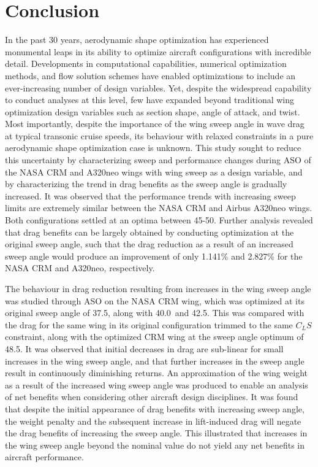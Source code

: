 \chapter{Conclusion}
In the past 30 years, aerodynamic shape optimization has experienced monumental leaps in its ability to optimize aircraft configurations with incredible detail.
Developments in computational capabilities, numerical optimization methods, and flow solution schemes have enabled optimizations to include an ever-increasing number of design variables.
Yet, despite the widespread capability to conduct analyses at this level, few have expanded beyond traditional wing optimization design variables such as section shape, angle of attack, and twist.
Most importantly, despite the importance of the wing sweep angle in wave drag at typical transonic cruise speeds, its behaviour with relaxed constraints in a pure aerodynamic shape optimization case is unknown.
This study sought to reduce this uncertainty by characterizing sweep and performance changes during ASO of the NASA CRM and A320neo wings with wing sweep as a design variable, and by characterizing the trend in drag benefits as the sweep angle is gradually increased.
It was observed that the performance trends with increasing sweep limits are extremely similar between the NASA CRM and Airbus A320neo wings. Both configurations settled at an optima between 45-50\degree. Further analysis revealed that drag benefits can be largely obtained by conducting optimization at the original sweep angle, such that the drag reduction as a result of an increased sweep angle would produce an improvement of only 1.141\% and 2.827\% for the NASA CRM and A320neo, respectively.

The behaviour in drag reduction resulting from increases in the wing sweep angle was studied through ASO on the NASA CRM wing, which was optimized at its original sweep angle of 37.5\degree, along with 40.0\degree\ and 42.5\degree. This was compared with the drag for the same wing in its original configuration trimmed to the same $C_L S$ constraint, along with the optimized CRM wing at the sweep angle optimum of 48.5\degree. It was observed that initial decreases in drag are sub-linear for small increases in the wing sweep angle, and that further increases in the sweep angle result in continuously diminishing returns. An approximation of the wing weight as a result of the increased wing sweep angle was produced to enable an analysis of net benefits when considering other aircraft design disciplines. It was found that despite the initial appearance of drag benefits with increasing sweep angle, the weight penalty and the subsequent increase in lift-induced drag will negate the drag benefits of increasing the sweep angle. This illustrated that increases in the wing sweep angle beyond the nominal value do not yield any net benefits in aircraft performance.


